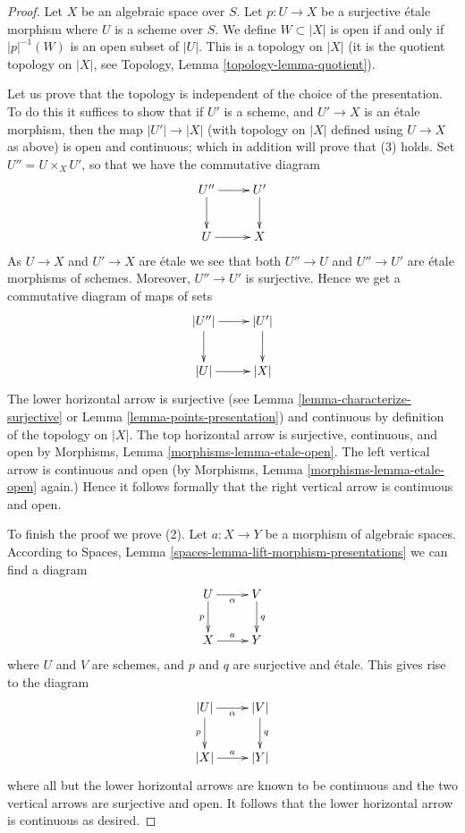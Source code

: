 \documentclass{stacks-project}
\theoremstyle{plain}
\theoremstyle{definition}
\theoremstyle{remark}
\numberwithin{equation}{subsection}
\begin{document}
\begin{proof}
Let $X$ be an algebraic space over $S$. Let $p : U \to X$ be a
surjective \'etale morphism where $U$ is a scheme over $S$.
We define $W \subset |X|$ is open if and only if $|p|^{-1}(W)$
is an open subset of $|U|$. This is a topology on $|X|$
(it is the quotient topology on $|X|$, see
Topology, Lemma \ref{topology-lemma-quotient}).

\medskip\noindent
Let us prove that the topology is independent of the choice of
the presentation. To do this it suffices to show that if $U'$ is a scheme,
and $U' \to X$ is an \'etale morphism, then the map $|U'| \to |X|$
(with topology on $|X|$ defined using $U \to X$ as above)
is open and continuous; which in addition will prove that (3) holds.
Set $U'' = U \times_X U'$, so that we have the commutative diagram
$$
\xymatrix{
U'' \ar[r] \ar[d] & U' \ar[d] \\
U \ar[r] & X
}
$$
As $U \to X$ and $U' \to X$ are \'etale we see that
both $U'' \to U$ and $U'' \to U'$ are \'etale morphisms of schemes.
Moreover, $U'' \to U'$ is surjective. Hence
we get a commutative diagram of maps of sets
$$
\xymatrix{
|U''| \ar[r] \ar[d] & |U'| \ar[d] \\
|U| \ar[r] & |X|
}
$$
The lower horizontal arrow is surjective (see
Lemma \ref{lemma-characterize-surjective}
or
Lemma \ref{lemma-points-presentation})
and continuous by definition of the topology on $|X|$.
The top horizontal arrow is surjective, continuous, and open by
Morphisms, Lemma \ref{morphisms-lemma-etale-open}.
The left vertical arrow is continuous and open (by
Morphisms, Lemma \ref{morphisms-lemma-etale-open}
again.) Hence it follows formally that the right vertical
arrow is continuous and open.

\medskip\noindent
To finish the proof we prove (2).
Let $a : X \to Y$ be a morphism of algebraic spaces. According to
Spaces, Lemma \ref{spaces-lemma-lift-morphism-presentations}
we can find a diagram
$$
\xymatrix{
U \ar[d]_p \ar[r]_\alpha & V \ar[d]^q \\
X \ar[r]^a & Y
}
$$
where $U$ and $V$ are schemes, and $p$ and $q$ are surjective and \'etale.
This gives rise to the diagram
$$
\xymatrix{
|U| \ar[d]_p \ar[r]_\alpha & |V| \ar[d]^q \\
|X| \ar[r]^a & |Y|
}
$$
where all but the lower horizontal arrows are known to be continuous and
the two vertical arrows are surjective and open. It follows that the
lower horizontal arrow is continuous as desired.
\end{proof}
\end{document}
